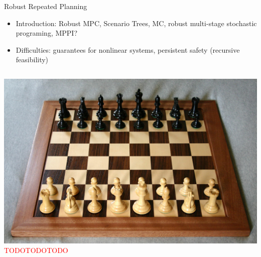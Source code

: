 \documentclass[lecture]{beamer}
\begin{document}
\begin{frame}{\normalsize Robust Repeated Planning}
\footnotesize
\begin{itemize}
\item Introduction: Robust MPC, Scenario Trees, MC, robust multi-stage stochastic programing, MPPI?
\item Difficulties: guarantees for nonlinear systems, persistent safety (recursive feasibility)
\end{itemize}

\begin{columns}[t]


\includegraphics[width=1\textwidth,clip]{Figures/Chess.pdf}
\textcolor{red}{TODOTODOTODO}
\end{columns}

\end{frame}


\end{document}
